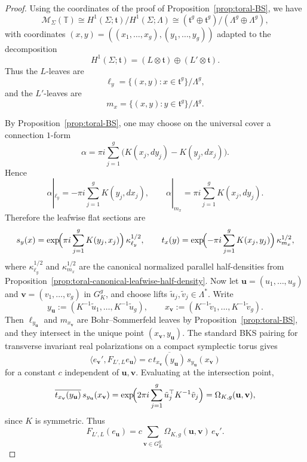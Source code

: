 \documentclass[12pt]{amsart}
\numberwithin{equation}{section}
\begin{document}
\begin{proof}
Using the coordinates of the proof of Proposition~\ref{prop:toral-BS}, we have
\[
\mathcal M_\Sigma(\mathbb T)
\cong H^1(\Sigma;\mathfrak t)/H^1(\Sigma;\Lambda)
\cong (\mathfrak t^g\oplus \mathfrak t^g)/(\Lambda^g\oplus\Lambda^g),
\]
with coordinates $(x,y)=((x_1,\dots,x_g),(y_1,\dots,y_g))$ adapted to the decomposition
\[
H^1(\Sigma;\mathfrak t)=(L\otimes \mathfrak t)\oplus (L'\otimes \mathfrak t).
\]
Thus the $L$-leaves are
\[
\ell_y=\{(x,y):x\in \mathfrak t^g\}/\Lambda^g,
\]
and the $L'$-leaves are
\[
m_x=\{(x,y):y\in \mathfrak  t^g\}/\Lambda^g.
\]

By Proposition~\ref{prop:toral-BS}, one may choose on the universal cover a connection
$1$-form
\[
\alpha
=
\pi i\sum_{j=1}^g\bigl(K(x_j,dy_j)-K(y_j,dx_j)\bigr).
\]
Hence
\[
\alpha|_{\ell_y}
=
-\pi i\sum_{j=1}^g K(y_j,dx_j),
\qquad
\alpha|_{m_x}
=
\pi i\sum_{j=1}^g K(x_j,dy_j).
\]
Therefore the leafwise flat sections are
\[
s_y(x)
=
\exp\!\Bigl(\pi i\sum_{j=1}^g K(y_j,x_j)\Bigr)\,\kappa_{\ell_y}^{1/2},
\qquad
t_x(y)
=
\exp\!\Bigl(-\pi i\sum_{j=1}^g K(x_j,y_j)\Bigr)\,\kappa_{m_x}^{1/2},
\]
where $\kappa_{\ell_y}^{1/2}$ and $\kappa_{m_x}^{1/2}$ are the canonical normalized
parallel half-densities from
Proposition~\ref{prop:toral-canonical-leafwise-half-density}. Now let $\mathbf u=(u_1,\dots,u_g)$ and $\mathbf v=(v_1,\dots,v_g)$ in $G_K^g$, and choose
lifts $\tilde u_j,\tilde v_j\in\Lambda^*$. Write
\[
y_{\mathbf u}:=(K^{-1}\tilde u_1,\dots,K^{-1}\tilde u_g),\qquad
x_{\mathbf v}:=(K^{-1}\tilde v_1,\dots,K^{-1}\tilde v_g).
\]
Then $\ell_{y_{\mathbf u}}$ and $m_{x_{\mathbf v}}$ are Bohr--Sommerfeld leaves by
Proposition~\ref{prop:toral-BS}, and they intersect in the unique point
$(x_{\mathbf v},y_{\mathbf u})$. The standard BKS pairing for transverse invariant real
polarizations on a compact symplectic torus gives
\[
\langle e_{\mathbf v}',F_{L',L}e_{\mathbf u}\rangle
=
c\,\overline{t_{x_{\mathbf v}}(y_{\mathbf u})}\,s_{y_{\mathbf u}}(x_{\mathbf v})
\]
for a constant $c$ independent of $\mathbf u,\mathbf v$. Evaluating at the intersection
point,
\[
\overline{t_{x_{\mathbf v}}(y_{\mathbf u})}\,s_{y_{\mathbf u}}(x_{\mathbf v})
=
\exp\!\Bigl(2\pi i\sum_{j=1}^g \tilde u_j^{\top}K^{-1}\tilde v_j\Bigr)
=
\Omega_{K,g}(\mathbf u,\mathbf v),
\]
since $K$ is symmetric. Thus
\[
F_{L',L}(e_{\mathbf u})
=
c\sum_{\mathbf v\in G_K^g}\Omega_{K,g}(\mathbf u,\mathbf v)\,e_{\mathbf v}'.
\]


\end{proof}
\end{document}
